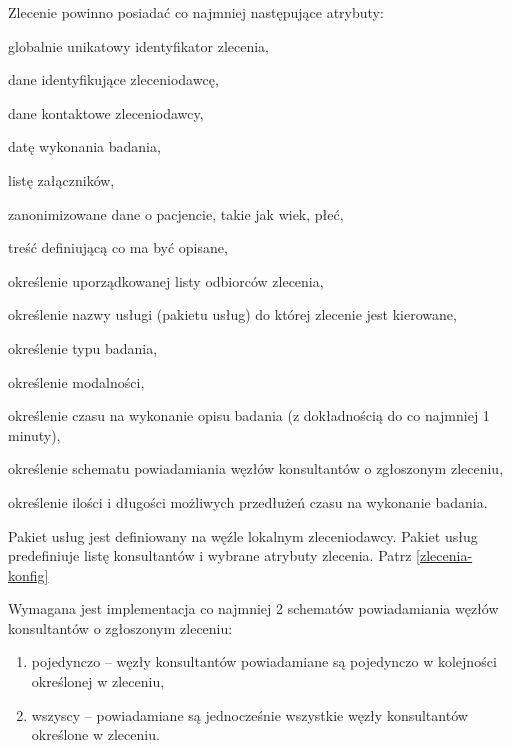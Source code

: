\documentclass[a4paper]{report}
\begin{document}
Zlecenie powinno posiadać co najmniej następujące atrybuty:
\begin{enumerate*}
\item globalnie unikatowy identyfikator zlecenia,
\item dane identyfikujące zleceniodawcę,
\item dane kontaktowe zleceniodawcy,
\item datę wykonania badania,
\item listę załączników,
\item zanonimizowane dane o pacjencie, takie jak wiek, płeć,
\item treść definiującą co ma być opisane,
\item określenie uporządkowanej listy odbiorców zlecenia,
\item określenie nazwy usługi (pakietu usług) do której zlecenie jest kierowane,
\item określenie typu badania,
\item określenie modalności,
\item określenie czasu na wykonanie opisu badania (z dokładnością do co najmniej 1 minuty),
\item określenie schematu powiadamiania węzłów konsultantów o zgłoszonym zleceniu,
\item określenie ilości i długości możliwych przedłużeń czasu na wykonanie badania.
\end{enumerate*}

Pakiet usług jest definiowany na węźle lokalnym zleceniodawcy. Pakiet usług predefiniuje listę konsultantów i wybrane atrybuty zlecenia. Patrz \ref{zlecenia-konfig}

Wymagana jest implementacja co najmniej 2 schematów powiadamiania węzłów konsultantów o zgłoszonym zleceniu:
\begin{enumerate}
 \item pojedynczo -- węzły konsultantów powiadamiane są pojedynczo w kolejności określonej w zleceniu,
 \item wszyscy -- powiadamiane są jednocześnie wszystkie węzły konsultantów określone w zleceniu.
\end{enumerate}
\end{document}
